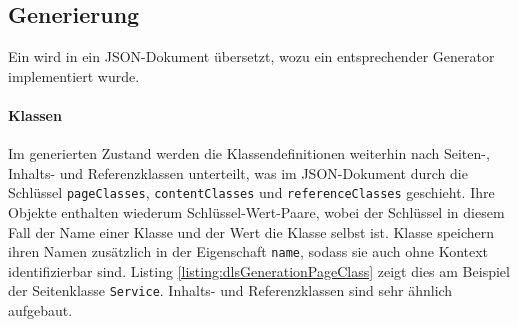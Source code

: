 \subsection{Generierung}
    \label{section:solutionDetailsDslGeneration}
    Ein {\classificationModel} wird in ein JSON-Dokument übersetzt,
    wozu ein entsprechender Generator implementiert wurde.

    \paragraph{Klassen}
    Im generierten Zustand werden die Klassendefinitionen weiterhin nach
    Seiten-, Inhalts- und Referenzklassen unterteilt,
    was im JSON-Dokument durch die Schlüssel \texttt{pageClasses},
    \texttt{contentClasses} und \texttt{referenceClasses} geschieht.
    Ihre Objekte enthalten wiederum Schlüssel-Wert-Paare,
    wobei der Schlüssel in diesem Fall der Name einer Klasse und der
    Wert die Klasse selbst ist.
    Klasse speichern ihren Namen zusätzlich in der Eigenschaft \texttt{name},
    sodass sie auch ohne Kontext identifizierbar sind.
    Listing \ref{listing:dlsGenerationPageClass} zeigt dies am Beispiel
    der Seitenklasse \texttt{Service}.
    Inhalts- und Referenzklassen sind sehr ähnlich aufgebaut.

    

